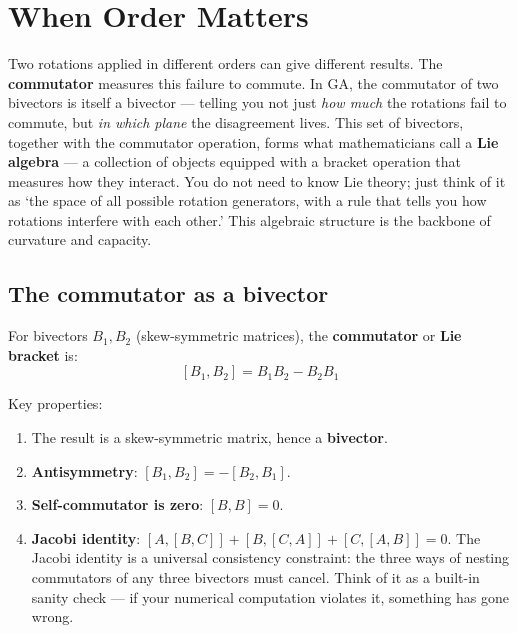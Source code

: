 \documentclass[11pt, twoside, openright]{memoir}
\begin{document}
\chapter{When Order Matters}
\label{chap:commutators}

\begin{whycare}
Two rotations applied in different orders can give different results.
The \textbf{commutator} measures this failure to commute.  In GA, the
commutator of two bivectors is itself a bivector --- telling you not just
\emph{how much} the rotations fail to commute, but \emph{in which plane}
the disagreement lives.  This set of bivectors, together with the commutator operation, forms what mathematicians call a \textbf{Lie algebra} --- a collection of objects equipped with a bracket operation that measures how they interact. You do not need to know Lie theory; just think of it as `the space of all possible rotation generators, with a rule that tells you how rotations interfere with each other.' This algebraic structure is the backbone of curvature and capacity.
\end{whycare}

\section{The commutator as a bivector}

For bivectors $B_1, B_2$ (skew-symmetric matrices), the
\textbf{commutator} or \textbf{Lie bracket} is:
\[
  [B_1, B_2] = B_1 B_2 - B_2 B_1
\]

Key properties:
\begin{enumerate}[nosep]
\item The result is a skew-symmetric matrix, hence a \textbf{bivector}.
\item \textbf{Antisymmetry}: $[B_1, B_2] = -[B_2, B_1]$.
\item \textbf{Self-commutator is zero}: $[B, B] = 0$.
\item \textbf{Jacobi identity}:
  $[A,[B,C]] + [B,[C,A]] + [C,[A,B]] = 0$.
  The Jacobi identity is a universal consistency constraint: the three ways of nesting commutators of any three bivectors must cancel. Think of it as a built-in sanity check --- if your numerical computation violates it, something has gone wrong.
\end{enumerate}
\end{document}
